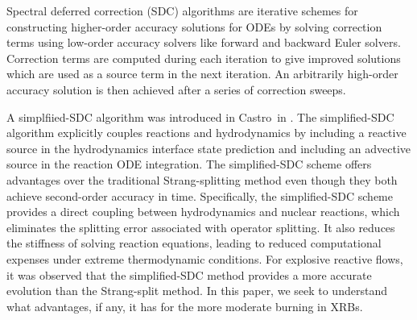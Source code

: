 \documentclass[preprint,times,tighten]{aastex631}
\newcommand{\castro}{{\sf Castro}}
\begin{document}
Spectral deferred correction (SDC) algorithms  \citep{dutt2000sdc, bourlioux2003reaction_sdc, castro-sdc} are iterative schemes for constructing higher-order accuracy solutions for ODEs by solving correction terms using low-order accuracy solvers like forward and backward Euler solvers. Correction terms are computed during each iteration to give improved solutions which are used as a source term in the next iteration. An arbitrarily high-order accuracy solution is then achieved after a series of correction sweeps. 


A simplfiied-SDC algorithm was introduced in \castro\ in \cite{castro_simple_sdc}.  The simplified-SDC algorithm explicitly couples reactions and hydrodynamics by including a reactive source in the hydrodynamics
interface state prediction and including an advective source in the reaction ODE integration.  
The simplified-SDC scheme offers advantages over the traditional Strang-splitting method even though they both achieve second-order accuracy in time. Specifically, the simplified-SDC scheme provides a direct coupling between hydrodynamics and nuclear reactions, which eliminates the splitting error associated with operator splitting. It also reduces the stiffness of solving reaction equations, leading to reduced computational expenses under extreme thermodynamic conditions.  For
explosive reactive flows, it was observed that the simplified-SDC method
provides a more accurate evolution than the Strang-split method.  In this paper, we seek to understand what advantages, if any, it has for the more moderate burning in XRBs.
\end{document}
